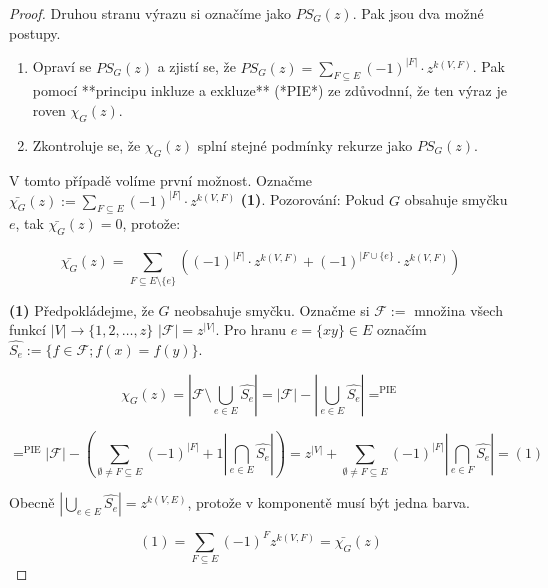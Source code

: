 \begin{proof}
	Druhou stranu výrazu si označíme jako $PS_{G}(z)$. Pak jsou dva možné postupy.
	
	\begin{enumerate}
		\item Opraví se $PS_{G}(z)$ a zjistí se, že $PS_{G}(z) = \sum_{F \subseteq E}(-1)^{|F|} \cdot z^{k(V,F)}$. Pak pomocí **principu inkluze a exkluze** (*PIE*) ze zdůvodnní, že ten výraz je roven $\chi_{G}(z)$.
		\item Zkontroluje se, že $\chi_{G}(z)$ splní stejné podmínky rekurze jako $PS_{G}(z)$.
	\end{enumerate}
	
	V tomto případě volíme první možnost. Označme $\bar{\chi_{G}}(z) := \sum_{F \subseteq E}(-1)^{|F|} \cdot z^{k(V,F)}$ \textbf{(1)}. Pozorování: Pokud $G$ obsahuje smyčku $e$, tak $\bar{\chi_{G}}(z) = 0$, protože:
	
	$$
	\bar{\chi_{G}}(z) = \sum_{F \subseteq E \setminus \{e\}}((-1)^{|F|} \cdot z^{k(V,F)} + (-1)^{|F \cup \{e\}} \cdot z^{k(V,F)})
	$$
	
	\textbf{(1)} Předpokládejme, že $G$ neobsahuje smyčku. Označme si $\mathcal{F}:=$ množina všech funkcí $|V| \to \{1,2,\dots, z\}$ $|\mathcal{F}|= z^{|V|}$. Pro hranu $e = \{xy\} \in E$ označím $\hat{S_{e}}:= \{f \in \mathcal{F}; f(x) = f(y)\}$.
	
	$$
	\chi_{G}(z) = |\mathcal{F} \setminus \bigcup_{e \in E}\hat{S_{e}}| = |\mathcal{F}| - |\bigcup_{e \in E}\hat{S_{e}}| =^{\text{PIE}}
	$$
	
	$$
	=^{\text{PIE}} |\mathcal{F}| - (\sum_{\emptyset \neq F \subseteq E} (-1)^{|F|}+1 |\bigcap_{e \in E} \hat{S_{e}}|) = z^{|V|} + \sum_{\emptyset \neq F \subseteq E}(-1)^{|F|}|\bigcap_{e \in F}\hat{S_{e}}| =(1)
	$$
	
	Obecně $|\bigcup_{e \in E} \hat{S_{e}}| = z^{k(V,E)}$, protože v komponentě musí být jedna barva.
	
	$$
	(1) = \sum_{F \subseteq E}(-1)^{F} z^{k(V,F)} = \bar{\chi_{G}}(z)
	$$
\end{proof}
